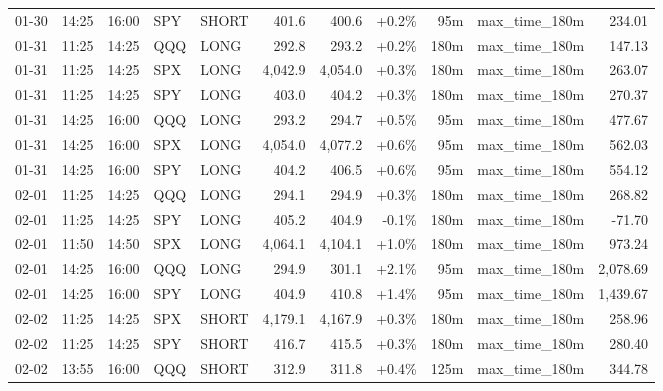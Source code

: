 \documentclass[11pt,a4paper,twoside]{article}
\begin{document}
\begin{center}
\begin{longtable}{>{\color{txtmain}}l l l l l r r r r >{\color{txtmain}}l r}
01-30 & 14:25 & 16:00 & SPY & SHORT & 401.6 & 400.6 & \textcolor{wingreen}{+0.2\%} & 95m & max\_time\_180m & \textcolor{wingreen}{234.01} \\
01-31 & 11:25 & 14:25 & QQQ & LONG & 292.8 & 293.2 & \textcolor{wingreen}{+0.2\%} & 180m & max\_time\_180m & \textcolor{wingreen}{147.13} \\
01-31 & 11:25 & 14:25 & SPX & LONG & 4,042.9 & 4,054.0 & \textcolor{wingreen}{+0.3\%} & 180m & max\_time\_180m & \textcolor{wingreen}{263.07} \\
01-31 & 11:25 & 14:25 & SPY & LONG & 403.0 & 404.2 & \textcolor{wingreen}{+0.3\%} & 180m & max\_time\_180m & \textcolor{wingreen}{270.37} \\
01-31 & 14:25 & 16:00 & QQQ & LONG & 293.2 & 294.7 & \textcolor{wingreen}{+0.5\%} & 95m & max\_time\_180m & \textcolor{wingreen}{477.67} \\
01-31 & 14:25 & 16:00 & SPX & LONG & 4,054.0 & 4,077.2 & \textcolor{wingreen}{+0.6\%} & 95m & max\_time\_180m & \textcolor{wingreen}{562.03} \\
01-31 & 14:25 & 16:00 & SPY & LONG & 404.2 & 406.5 & \textcolor{wingreen}{+0.6\%} & 95m & max\_time\_180m & \textcolor{wingreen}{554.12} \\
02-01 & 11:25 & 14:25 & QQQ & LONG & 294.1 & 294.9 & \textcolor{wingreen}{+0.3\%} & 180m & max\_time\_180m & \textcolor{wingreen}{268.82} \\
02-01 & 11:25 & 14:25 & SPY & LONG & 405.2 & 404.9 & \textcolor{lossred}{-0.1\%} & 180m & max\_time\_180m & \textcolor{lossred}{-71.70} \\
02-01 & 11:50 & 14:50 & SPX & LONG & 4,064.1 & 4,104.1 & \textcolor{wingreen}{+1.0\%} & 180m & max\_time\_180m & \textcolor{wingreen}{973.24} \\
02-01 & 14:25 & 16:00 & QQQ & LONG & 294.9 & 301.1 & \textcolor{wingreen}{+2.1\%} & 95m & max\_time\_180m & \textcolor{wingreen}{2,078.69} \\
02-01 & 14:25 & 16:00 & SPY & LONG & 404.9 & 410.8 & \textcolor{wingreen}{+1.4\%} & 95m & max\_time\_180m & \textcolor{wingreen}{1,439.67} \\
02-02 & 11:25 & 14:25 & SPX & SHORT & 4,179.1 & 4,167.9 & \textcolor{wingreen}{+0.3\%} & 180m & max\_time\_180m & \textcolor{wingreen}{258.96} \\
02-02 & 11:25 & 14:25 & SPY & SHORT & 416.7 & 415.5 & \textcolor{wingreen}{+0.3\%} & 180m & max\_time\_180m & \textcolor{wingreen}{280.40} \\
02-02 & 13:55 & 16:00 & QQQ & SHORT & 312.9 & 311.8 & \textcolor{wingreen}{+0.4\%} & 125m & max\_time\_180m & \textcolor{wingreen}{344.78} \\

\end{longtable}
\end{center}
\end{document}
